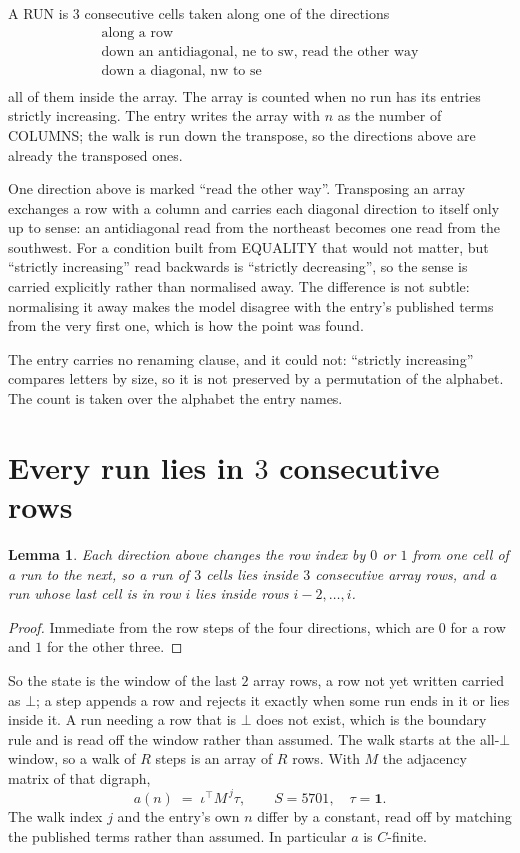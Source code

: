 \documentclass[11pt,a4paper]{article}
\theoremstyle{plain}
\newtheorem{lemma}[theorem]{Lemma}
\theoremstyle{definition}
\begin{document}
A RUN is $3$ consecutive cells taken along one of the directions
\[
\begin{array}{l}
\text{along a row} \\
\text{down an antidiagonal, ne to sw, read the other way} \\
\text{down a diagonal, nw to se} \\
\end{array}
\]
all of them inside the array. The array is counted when no run has its entries strictly increasing. The entry writes the array with $n$ as the number of COLUMNS; the walk is run down the transpose, so the directions above are already the transposed ones.


One direction above is marked ``read the other way''. Transposing an array exchanges a row with
a column and carries each diagonal direction to itself only up to sense: an antidiagonal read
from the northeast becomes one read from the southwest. For a condition built from EQUALITY
that would not matter, but ``strictly increasing'' read backwards is ``strictly decreasing'',
so the sense is carried explicitly rather than normalised away. The
difference is not subtle: normalising it away makes the model disagree with the entry's
published terms from the very first one, which is how the point was found.

The entry carries no renaming clause, and it could not: ``strictly increasing'' compares
letters by size, so it is not preserved by a permutation of the alphabet. The count is taken
over the alphabet the entry names.

\section{Every run lies in $3$ consecutive rows}

\begin{lemma}\label{lem:win}
Each direction above changes the row index by $0$ or $1$ from one cell of a run to the next, so
a run of $3$ cells lies inside $3$ consecutive array rows, and a run whose last cell is in
row $i$ lies inside rows $i-2,\dots,i$.
\end{lemma}

\begin{proof}
Immediate from the row steps of the four directions, which are $0$ for a row and $1$ for the
other three.
\end{proof}

So the state is the window of the last $2$ array rows, a row not yet written carried as
$\bot$; a step appends a row and rejects it exactly when some run ends in it or lies inside it.
A run needing a row that is $\bot$ does not exist, which is the boundary rule and is read off
the window rather than assumed. The walk starts at the all-$\bot$ window, so a walk of $R$ steps
is an array of $R$ rows. With $M$ the adjacency matrix of that digraph,
\[
a(n)\;=\;\iota^{\!\top}M^{\,j}\tau ,\qquad S=5701,\quad\tau=\mathbf{1} .
\]
The walk index $j$ and the entry's own $n$ differ by a constant, read off by matching the
published terms rather than assumed. In particular $a$ is $C$-finite.
\end{document}
